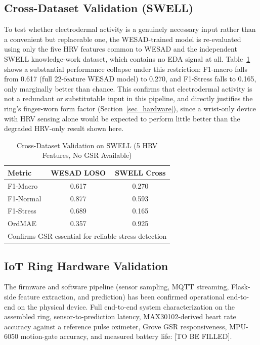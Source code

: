\documentclass[conference]{IEEEtran}
\begin{document}
\subsection{Cross-Dataset Validation (SWELL)}
To test whether electrodermal activity is a genuinely
necessary input rather than a convenient but replaceable one,
the WESAD-trained model is re-evaluated using only the five
HRV features common to WESAD and the independent SWELL
knowledge-work dataset, which contains no EDA signal at all.
Table~\ref{tab_swell} shows a substantial performance
collapse under this restriction: F1-macro falls from 0.617
(full 22-feature WESAD model) to 0.270, and F1-Stress falls to
0.165, only marginally better than chance. This confirms that
electrodermal activity is not a redundant or substitutable
input in this pipeline, and directly justifies the ring's
finger-worn form factor (Section~\ref{sec_hardware}), since a
wrist-only device with HRV sensing alone would be expected to
perform little better than the degraded HRV-only result shown
here.

\begin{table}[htbp]
\caption{Cross-Dataset Validation on SWELL
(5 HRV Features, No GSR Available)}
\begin{center}
\begin{tabular}{|l|c|c|}
\hline
\textbf{Metric} &
\textbf{WESAD LOSO} &
\textbf{SWELL Cross} \\
\hline
F1-Macro & 0.617 & 0.270 \\
F1-Normal & 0.877 & 0.593 \\
F1-Stress & 0.689 & 0.165 \\
OrdMAE & 0.357 & 0.925 \\
\hline
\multicolumn{3}{l}{Confirms GSR essential
for reliable stress detection} \\
\end{tabular}
\label{tab_swell}
\end{center}
\end{table}

\subsection{IoT Ring Hardware Validation}
The firmware and software pipeline (sensor sampling, MQTT
streaming, Flask-side feature extraction, and prediction) has
been confirmed operational end-to-end on the physical device.
Full end-to-end system characterization on the assembled ring,
sensor-to-prediction latency, MAX30102-derived heart rate
accuracy against a reference pulse oximeter, Grove GSR
responsiveness, MPU-6050 motion-gate accuracy, and measured
battery life: [TO BE FILLED].
\end{document}
